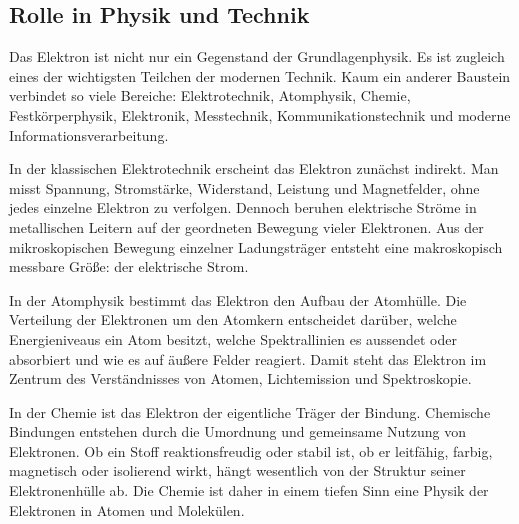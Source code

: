 \subsection{Rolle in Physik und Technik}
\label{sec:rolle-physik-technik}

Das Elektron ist nicht nur ein Gegenstand der Grundlagenphysik.
Es ist zugleich eines der wichtigsten Teilchen der modernen Technik. Kaum ein anderer
Baustein verbindet so viele Bereiche: Elektrotechnik,
Atomphysik, Chemie, Festkörperphysik,
Elektronik, Messtechnik, Kommunikationstechnik
und moderne Informationsverarbeitung.

In der klassischen Elektrotechnik erscheint das Elektron zunächst indirekt. Man misst
Spannung, Stromstärke, Widerstand,
Leistung und Magnetfelder, ohne jedes einzelne Elektron
zu verfolgen. Dennoch beruhen elektrische Ströme in metallischen Leitern auf der
geordneten Bewegung vieler Elektronen. Aus der mikroskopischen Bewegung einzelner
Ladungsträger entsteht eine makroskopisch messbare Größe:
der elektrische Strom.

In der Atomphysik bestimmt das Elektron den Aufbau der Atomhülle.
Die Verteilung der Elektronen um den Atomkern entscheidet darüber,
welche Energieniveaus ein Atom besitzt, welche Spektrallinien
es aussendet oder absorbiert und wie es auf äußere Felder reagiert. Damit steht das
Elektron im Zentrum des Verständnisses von Atomen, Lichtemission
und Spektroskopie.

In der Chemie ist das Elektron der eigentliche Träger der Bindung. Chemische
Bindungen entstehen durch die Umordnung und gemeinsame Nutzung
von Elektronen. Ob ein Stoff reaktionsfreudig oder stabil ist, ob er leitfähig,
farbig, magnetisch oder isolierend wirkt, hängt wesentlich von der Struktur seiner
Elektronenhülle ab. Die Chemie ist daher in einem tiefen Sinn eine Physik der
Elektronen in Atomen und Molekülen.

